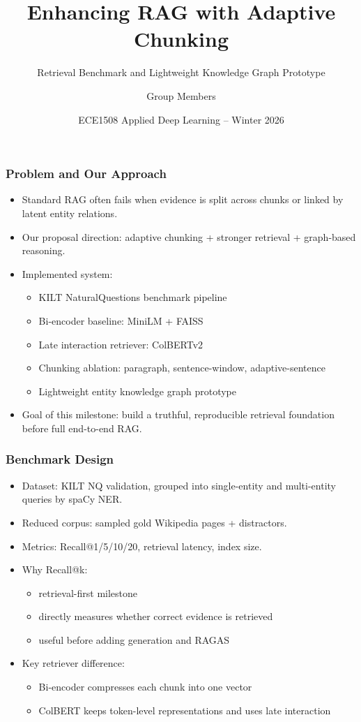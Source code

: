 \documentclass{beamer}
\title[Adaptive Chunking for RAG]
{Enhancing RAG with Adaptive Chunking}
\subtitle{Retrieval Benchmark and Lightweight Knowledge Graph Prototype}
\author[Group Project]
{Group Members}
\institute[]
{
  Department of Electrical and Computer Engineering\\
  University of Toronto
}
\date[Winter 2026]
{ECE1508 Applied Deep Learning -- Winter 2026}
\begin{document}
\frame{\titlepage}

\begin{frame}
\frametitle{Problem and Our Approach}
\small
\begin{itemize}
  \item Standard RAG often fails when evidence is split across chunks or linked by latent entity relations.
  \item Our proposal direction: adaptive chunking + stronger retrieval + graph-based reasoning.
  \item Implemented system:
  \begin{itemize}
    \item KILT NaturalQuestions benchmark pipeline
    \item Bi-encoder baseline: MiniLM + FAISS
    \item Late interaction retriever: ColBERTv2
    \item Chunking ablation: paragraph, sentence-window, adaptive-sentence
    \item Lightweight entity knowledge graph prototype
  \end{itemize}
  \item Goal of this milestone: build a truthful, reproducible retrieval foundation before full end-to-end RAG.
\end{itemize}
\end{frame}

\begin{frame}
\frametitle{Benchmark Design}
\small
\begin{itemize}
  \item Dataset: KILT NQ validation, grouped into single-entity and multi-entity queries by spaCy NER.
  \item Reduced corpus: sampled gold Wikipedia pages + distractors.
  \item Metrics: Recall@1/5/10/20, retrieval latency, index size.
  \item Why Recall@k:
  \begin{itemize}
    \item retrieval-first milestone
    \item directly measures whether correct evidence is retrieved
    \item useful before adding generation and RAGAS
  \end{itemize}
  \item Key retriever difference:
  \begin{itemize}
    \item Bi-encoder compresses each chunk into one vector
    \item ColBERT keeps token-level representations and uses late interaction
  \end{itemize}
\end{itemize}
\end{frame}
\end{document}
